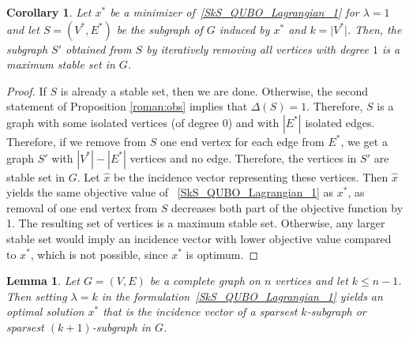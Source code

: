 \documentclass{article}
\newtheorem{lem}[thm]{Lemma}
\newtheorem{cor}[thm]{Corollary}
\begin{document}
\begin{cor}\label{lambda_equals_one}
Let $x^*$ be a minimizer of~\eqref{SkS_QUBO_Lagrangian_1} for $\lambda=1$ and let $S = (V^*, E^*)$ be the subgraph of $G$ induced by $x^*$ and $k = \vert V^* \vert$. Then, the subgraph $S'$ obtained from $S$ by iteratively removing all vertices with degree $1$ is a maximum stable set in $G$.   
\end{cor}

\begin{proof}
If $S$ is already a stable  set, then we are done. Otherwise, 
the second statement  of  Proposition \ref{roman:obs} implies that $\Delta(S) = 1$. Therefore, $S$ is a graph with  some isolated vertices (of degree 0) and with $|E^*|$ isolated edges. 
Therefore, if we remove from $S$ one end vertex for each edge from $E^*$, we get a graph $S'$ with $|V^*|-|E^*|$ vertices and no edge.
Therefore, the vertices in $S'$ are stable set in $G$. 
Let $\hat x$ be the incidence vector representing these vertices.
Then  $\hat x$ yields the same objective value of ~\eqref{SkS_QUBO_Lagrangian_1} as $x^*$, as removal of one end vertex from $S$  decreases both part of the objective function by 1.
The resulting set of vertices is a maximum stable set. Otherwise, any larger stable set would imply an incidence vector with lower objective value compared to $x^*$, which is not possible, since $x^*$ is optimum.
\end{proof}

\begin{lem}\label{complete_graph}
Let $G = (V, E)$ be a complete graph on $n$ vertices and let $k \leq n - 1$. Then setting $\lambda = k$ in the formulation~\eqref{SkS_QUBO_Lagrangian_1} yields an optimal solution $x^*$ that is the incidence vector of a sparsest $k$-subgraph or sparsest $(k+1)$-subgraph in $G$.
\end{lem}
\end{document}
